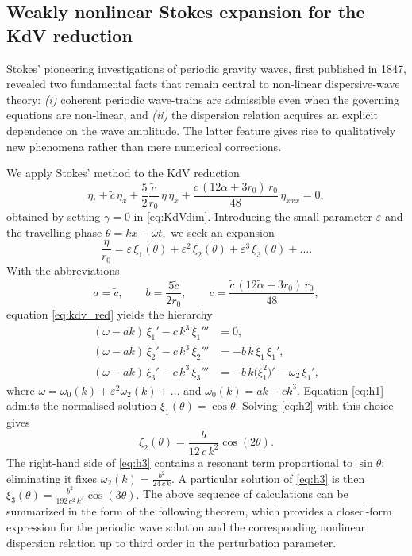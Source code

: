 \documentclass[alpha-refs, 12pt]{wiley-article}
\begin{document}
\subsection{Weakly nonlinear Stokes expansion for the KdV reduction}

Stokes' pioneering investigations of periodic gravity waves, first published in 1847, revealed two fundamental facts that remain central to non-linear dispersive‐wave theory: \textit{(i)} coherent periodic wave-trains are admissible even when the governing equations are non-linear, and \textit{(ii)} the dispersion relation acquires an explicit dependence on the wave amplitude. The latter feature gives rise to qualitatively new phenomena rather than mere numerical corrections.

We apply Stokes' method to the KdV reduction
\begin{equation}\label{eq:kdv_red}
  \eta_{t}
  +\tilde{c}\,\eta_{x}
  +\frac{5}{2}\frac{\tilde{c}}{r_{0}}\,
   \eta\,\eta_{x}
  +\frac{\tilde{c}\,(12\tilde{\alpha}+3r_{0})\,r_{0}}{48}\,
   \eta_{xxx}
  =0,
\end{equation}
obtained by setting $\gamma=0$ in \eqref{eq:KdVdim}. Introducing the small parameter $\varepsilon$ and the travelling phase
\(
  \theta=kx-\omega t,
\)
we seek an expansion
\begin{equation}\label{eq:stokes_ansatz}
  \frac{\eta}{r_{0}}
  =\varepsilon\,\xi_{1}(\theta)
   +\varepsilon^{2}\,\xi_{2}(\theta)
   +\varepsilon^{3}\,\xi_{3}(\theta)
   +\dots.
\end{equation}
With the abbreviations
\[
  a=\tilde{c},\qquad
  b=\frac{5\tilde{c}}{2r_{0}},\qquad
  c=\frac{\tilde{c}\,(12\tilde{\alpha}+3r_{0})\,r_{0}}{48},
\]
equation \eqref{eq:kdv_red} yields the hierarchy
\begin{align}
  (\omega-ak)\,\xi_{1}'-c\,k^{3}\,\xi_{1}''' &=0, \label{eq:h1}\\
  (\omega-ak)\,\xi_{2}'-c\,k^{3}\,\xi_{2}''' &=-b\,k\,\xi_{1}\,\xi_{1}',
             \label{eq:h2}\\
  (\omega-ak)\,\xi_{3}'-c\,k^{3}\,\xi_{3}'''
     &=-b\,k\bigl(\xi_{1}^{2}\bigr)'
       -\omega_{2}\,\xi_{1}', \label{eq:h3}
\end{align}
where
\(
  \omega=\omega_{0}(k)+\varepsilon^{2}\omega_{2}(k)+\dots
\)
and
\(
  \omega_{0}(k)=ak-ck^{3}.
\)
Equation \eqref{eq:h1} admits the normalised solution
\(
  \xi_{1}(\theta)=\cos\theta.
\)
Solving \eqref{eq:h2} with this choice gives
\[
  \xi_{2}(\theta)=\frac{b}{12\,c\,k^{2}}\cos(2\theta).
\]
The right-hand side of \eqref{eq:h3} contains a resonant term
proportional to $\sin\theta$; eliminating it fixes
\(
  \displaystyle
  \omega_{2}(k)=\frac{b^{2}}{24\,c\,k}.
\)
A particular solution of \eqref{eq:h3} is then
\(
  \displaystyle
  \xi_{3}(\theta)=\frac{b^{2}}{192\,c^{2}\,k^{4}}\cos(3\theta).
\)
The above sequence of calculations can be summarized in the form of the following theorem, which provides a closed-form expression for the periodic wave solution and the corresponding nonlinear dispersion relation up to third order in the perturbation parameter.
\end{document}

